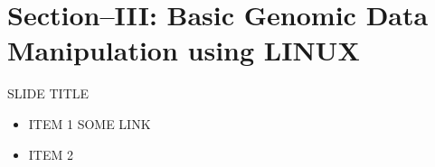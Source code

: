 


\maketitle
\section{Section--III: Basic Genomic Data Manipulation using LINUX	}
\begin{frame}[t]{SLIDE TITLE}
    \begin{itemize}
 
      \item ITEM 1
      SOME LINK
      \item ITEM 2
    \end{itemize}

\end{frame}



